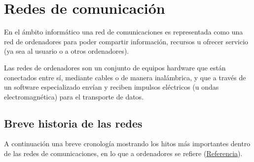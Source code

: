 \chapter{Redes de comunicación}
En el ámbito informático una red de comunicaciones es representada como una red de ordenadores para poder compartir información, recursos u ofrecer servicio (ya sea al usuario o a otros ordenadores).

Las redes de ordenadores son un conjunto de equipos hardware que están conectados entre sí, mediante cables o de manera inalámbrica, y que a través de un software especializado envían y reciben impulsos eléctricos (u ondas electromagnética) para el transporte de datos.


\section{Breve historia de las redes}
A continuación una breve cronología mostrando los hitos más importantes dentro de las redes de comunicaciones, en lo que a ordenadores se refiere (\href{https://en.wikipedia.org/wiki/Computer_network}{Referencia}).


